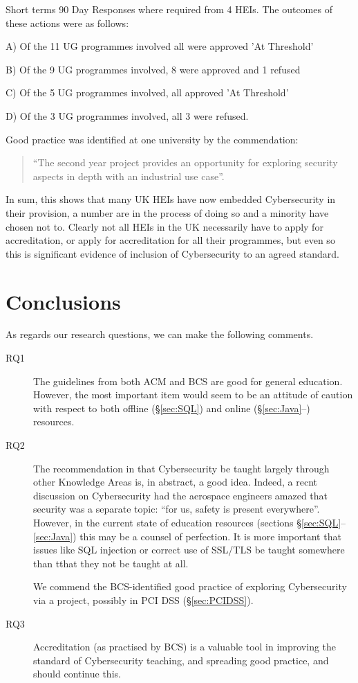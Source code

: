 \documentclass[conference]{IEEEtran}
\begin{document}
Short terms 90 Day Responses where required from 4 HEIs. The outcomes of these actions were as follows:
                                                                        
A)	Of the 11 UG programmes involved all were approved 'At Threshold'

B)	Of the 9 UG programmes involved, 8 were approved and 1 refused

C)	Of the 5 UG programmes involved, all approved 'At Threshold'

D)	Of the 3 UG programmes involved, all 3 were refused.
 
Good practice was identified at one university by the commendation:
 \begin{quote}
``The second year project provides an opportunity for exploring security aspects in depth with an industrial use case''.
\end{quote}
In sum, this shows that many UK HEIs have now embedded Cybersecurity in their provision, a number are in the process of doing so and a minority have chosen not to. Clearly not all HEIs in the UK necessarily have to apply for accreditation, or apply for accreditation for all their programmes, but even so this is significant evidence of inclusion of Cybersecurity to an agreed standard.

\section{Conclusions}
As regards our research questions, we can make the following comments.
\begin{description}
\item[RQ1]The guidelines from both ACM and BCS are good for general education. However, the most important item would seem to be an attitude of caution with respect to both offline (\S\ref{sec:SQL}) and online (\S\ref{sec:Java}--) resources. 
\item[RQ2]The recommendation in \cite[p. 98]{ACM2013a} that Cybersecurity be taught largely through other Knowledge Areas is, in abstract, a good idea. Indeed, a recnt discussion on Cybersecurity had the aerospace engineers amazed that security was a separate topic: ``for us, safety is present everywhere''.  However, in the current state of education resources (sections \S\ref{sec:SQL}--\ref{sec:Java}) this may be a counsel of perfection.  It is more important that issues like SQL injection \cite{Drop2019} or correct use of SSL/TLS \cite{Chenetal2019a} be taught somewhere than tthat they not be taught at all.
\par
We commend the BCS-identified good practice of exploring Cybersecurity via a project, possibly in PCI DSS (\S\ref{sec:PCIDSS}).
\item[RQ3]Accreditation (as practised by BCS) is a valuable tool in improving the standard of Cybersecurity teaching, and spreading good practice, and should continue this.
\end{description}
\end{document}
